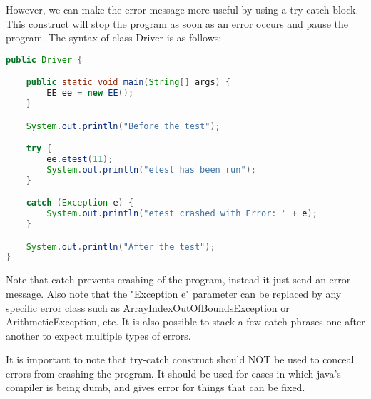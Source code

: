\documentclass [12 pt, twoside] {article}
\begin{document}
However, we can make the error message more useful by using a try-catch block. This
construct will stop the program as soon as an error occurs and pause the program. The
syntax of class Driver is as follows:


\begin{lstlisting}[language=java]
public Driver {

	public static void main(String[] args) {
		EE ee = new EE();
	}

	System.out.println("Before the test");

	try {
		ee.etest(11);
		System.out.println("etest has been run");
	}

	catch (Exception e) {
		System.out.println("etest crashed with Error: " + e);
	}

	System.out.println("After the test");
}
\end{lstlisting}

Note that catch prevents crashing of the program, instead it just send an
error message. Also note that the "Exception e" parameter can be replaced
by any specific error class such as ArrayIndexOutOfBoundsException or 
ArithmeticException, etc. It is also possible to stack a few catch phrases
one after another to expect multiple types of errors.


It is important to note that try-catch construct should NOT be used to conceal
errors from crashing the program. It should be used for cases in which java's
compiler is being dumb, and gives error for things that can be fixed.
\end{document}
